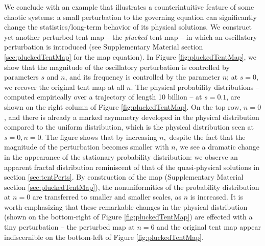 \documentclass[preprint,12pt]{elsarticle}
\begin{document}
We conclude with an example that illustrates a counterintuitive feature of some chaotic systems: a small perturbation to the 
governing equation can significantly change the statistics/long-term 
behavior of its physical solutions. We construct yet another 
perturbed tent map -- the \emph{plucked} 
tent map -- in which an oscillatory perturbation is introduced (see Supplementary Material section \ref{sec:pluckedTentMap} for the map equation). In Figure \ref{fig:pluckedTentMap}, we show that the magnitude of the oscillatory perturbation is controlled by parameters $s$ and $n$, and its frequency is controlled by the parameter $n$; at $s=0$, we recover the original tent map at all $n$. The physical probability distributions -- computed empirically over a trajectory of length 10 billion -- at $s=0.1$, are shown on the right column of Figure \ref{fig:pluckedTentMap}. On the top row, $n=0$, and there is already a marked asymmetry developed in the physical distribution compared to the uniform distribution, which is the physical distribution seen at $s=0, n=0$. The figure shows that by increasing $n,$ despite the fact that the magnitude of the perturbation becomes smaller with $n$, we see a dramatic change in the appearance of the stationary probability distribution: we observe an apparent fractal distribution reminiscent of that of the quasi-physical solutions in 
section \ref{sec:tentPerts}. By construction of the map (Supplementary Material section \ref{sec:pluckedTentMap}), the nonuniformities of the probability distribution at $n=0$ are transferred to smaller and smaller scales, 
as $n$ is increased. It is worth emphasizing that these remarkable changes in the physical distribution (shown on the bottom-right of Figure \ref{fig:pluckedTentMap}) are effected with a tiny perturbation -- the perturbed map at $n=6$ and the original tent map appear indiscernible on the bottom-left of Figure \ref{fig:pluckedTentMap}. 
\end{document}
